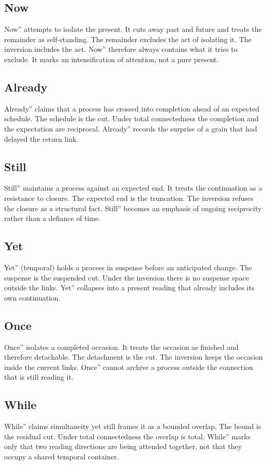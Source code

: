 \documentclass[11pt,a4paper]{article}
\begin{document}
\subsection{Now} Now'' attempts to isolate the present. It cuts away past and future and treats the remainder as self-standing. The remainder excludes the act of isolating it. The inversion includes the act. Now'' therefore always contains what it tries to exclude. It marks an intensification of attention, not a pure present.

\subsection{Already} Already'' claims that a process has crossed into completion ahead of an expected schedule. The schedule is the cut. Under total connectedness the completion and the expectation are reciprocal. Already'' records the surprise of a grain that had delayed the return link.

\subsection{Still} Still'' maintains a process against an expected end. It treats the continuation as a resistance to closure. The expected end is the truncation. The inversion refuses the closure as a structural fact. Still'' becomes an emphasis of ongoing reciprocity rather than a defiance of time.

\subsection{Yet} Yet'' (temporal) holds a process in suspense before an anticipated change. The suspense is the suspended cut. Under the inversion there is no suspense space outside the links. Yet'' collapses into a present reading that already includes its own continuation.

\subsection{Once} Once'' isolates a completed occasion. It treats the occasion as finished and therefore detachable. The detachment is the cut. The inversion keeps the occasion inside the current links. Once'' cannot archive a process outside the connection that is still reading it.

\subsection{While} While'' claims simultaneity yet still frames it as a bounded overlap. The bound is the residual cut. Under total connectedness the overlap is total. While'' marks only that two reading directions are being attended together, not that they occupy a shared temporal container.
\end{document}
